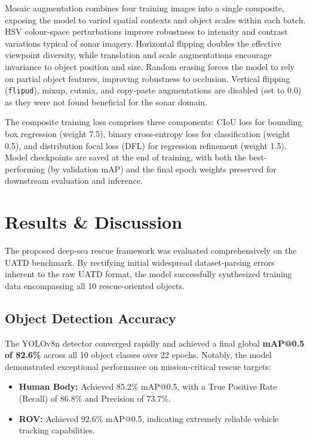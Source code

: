 \documentclass[conference]{IEEEtran}
\begin{document}
Mosaic augmentation combines four training images into a single composite, exposing the model to varied spatial contexts and object scales within each batch. HSV colour-space perturbations improve robustness to intensity and contrast variations typical of sonar imagery. Horizontal flipping doubles the effective viewpoint diversity, while translation and scale augmentations encourage invariance to object position and size. Random erasing forces the model to rely on partial object features, improving robustness to occlusion. Vertical flipping (\texttt{flipud}), mixup, cutmix, and copy-paste augmentations are disabled (set to 0.0) as they were not found beneficial for the sonar domain.

The composite training loss comprises three components: CIoU loss for bounding box regression (weight 7.5), binary cross-entropy loss for classification (weight 0.5), and distribution focal loss (DFL) for regression refinement (weight 1.5). Model checkpoints are saved at the end of training, with both the best-performing (by validation mAP) and the final epoch weights preserved for downstream evaluation and inference.

\section{Results \& Discussion}

The proposed deep-sea rescue framework was evaluated comprehensively on the UATD benchmark. By rectifying initial widespread dataset-parsing errors inherent to the raw UATD format, the model successfully synthesized training data encompassing all 10 rescue-oriented objects.

\subsection{Object Detection Accuracy}
The YOLOv8n detector converged rapidly and achieved a final global \textbf{mAP@0.5 of 82.6\%} across all 10 object classes over 22 epochs. Notably, the model demonstrated exceptional performance on mission-critical rescue targets:
\begin{itemize}
    \item \textbf{Human Body:} Achieved 85.2\% mAP@0.5, with a True Positive Rate (Recall) of 86.8\% and Precision of 73.7\%.
    \item \textbf{ROV:} Achieved 92.6\% mAP@0.5, indicating extremely reliable vehicle tracking capabilities.
\end{itemize}
\end{document}
